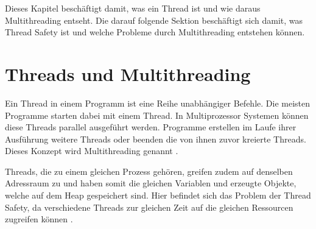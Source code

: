 Dieses Kapitel beschäftigt damit, was ein Thread ist und wie daraus Multithreading entseht. Die darauf folgende Sektion beschäftigt sich damit, was Thread Safety ist und welche Probleme durch Multithreading entstehen können.

\section{Threads und Multithreading}\label{sec:threads}

Ein Thread in einem Programm ist eine Reihe unabhängiger Befehle.  Die meisten Programme starten dabei mit einem Thread. In Multiprozessor Systemen können diese Threads parallel ausgeführt werden. Programme erstellen im Laufe ihrer Ausführung weitere Threads oder beenden die von ihnen zuvor kreierte Threads. Dieses Konzept wird Multithreading genannt \cite[vgl.][70]{banerjee_theory_2006}.

Threads, die zu einem gleichen Prozess gehören, greifen zudem auf denselben Adressraum zu und haben somit die gleichen Variablen und erzeugte Objekte, welche auf dem Heap gespeichert sind. Hier befindet sich das Problem der Thread Safety, da verschiedene Threads zur gleichen Zeit auf die gleichen Ressourcen zugreifen können \cite[vgl.][2]{brian}.